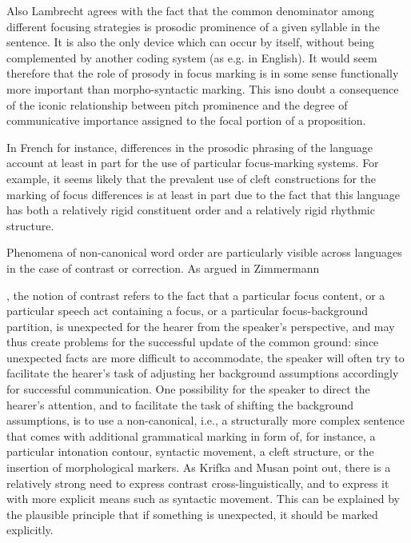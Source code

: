 \documentclass[12pt]{report}
\begin{document}
Also Lambrecht \cite{lambrecht1996information} agrees with the fact that the common denominator among different focusing strategies is prosodic prominence of a given syllable in the sentence. It is also the only device which can occur by itself, without being complemented by another coding system (as e.g. in English). It would seem therefore that the role of prosody in focus marking is in some sense functionally more important than morpho-syntactic marking. This isno doubt a consequence of the iconic relationship between pitch prominence and the degree of communicative importance assigned to the focal portion of a proposition.

In French for instance, differences in the prosodic phrasing of the language account at least in part for the use of particular focus-marking systems. For example, it seems likely that the prevalent use of cleft constructions for the marking of focus differences is at least in part due to the fact that this language has both a relatively rigid constituent order and a relatively rigid rhythmic structure.

Phenomena of non-canonical word order are particularly visible across languages in the case of contrast or correction. As argued in Zimmermann 

\noindent
\cite{zimmermann2008contrastive}, the notion of contrast refers to the fact that a particular focus content, or a particular speech act containing a focus, or a particular focus-background partition, is unexpected for the hearer from the speaker’s perspective, and may thus create problems for the successful update of the common ground: since unexpected facts are more difficult to accommodate, the speaker will often try to facilitate the hearer’s task of adjusting her background assumptions accordingly for successful communication. One possibility for the speaker to direct the hearer’s attention, and to facilitate the task of shifting the background assumptions, is to use a non-canonical, i.e., a structurally more complex sentence that comes with additional grammatical marking in form of, for instance, a particular intonation contour, syntactic movement, a cleft structure, or the insertion of morphological markers. 
As Krifka and Musan \cite{krifka2012expression} point out, there is a relatively strong need to express contrast cross-linguistically, and to express it with more explicit means such as syntactic movement. This can be explained by the plausible principle that if something is unexpected, it should be marked explicitly. 
\end{document}
